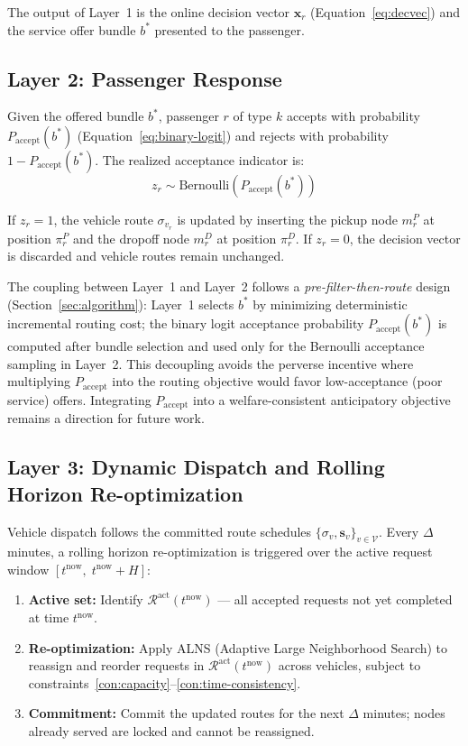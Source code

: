 The output of Layer~1 is the online decision vector $\mathbf{x}_r$ (Equation~\ref{eq:decvec})
and the service offer bundle $b^*$ presented to the passenger.

\subsection{Layer 2: Passenger Response}

Given the offered bundle $b^*$, passenger $r$ of type $k$ accepts with probability
$P_{\text{accept}}(b^*)$ (Equation~\ref{eq:binary-logit}) and rejects with probability
$1 - P_{\text{accept}}(b^*)$. The realized acceptance indicator is:
\begin{equation}
  z_r \sim \text{Bernoulli}\!\left(P_{\text{accept}}(b^*)\right)
\end{equation}

If $z_r = 1$, the vehicle route $\sigma_{v_r}$ is updated by inserting the pickup node
$m_r^P$ at position $\pi_r^P$ and the dropoff node $m_r^D$ at position $\pi_r^D$.
If $z_r = 0$, the decision vector is discarded and vehicle routes remain unchanged.

The coupling between Layer~1 and Layer~2 follows a \emph{pre-filter-then-route} design
(Section~\ref{sec:algorithm}): Layer~1 selects $b^*$ by minimizing deterministic
incremental routing cost; the binary logit acceptance probability
$P_{\text{accept}}(b^*)$ is computed after bundle selection and used only for
the Bernoulli acceptance sampling in Layer~2. This decoupling avoids the perverse
incentive where multiplying $P_{\text{accept}}$ into the routing objective would
favor low-acceptance (poor service) offers. Integrating $P_{\text{accept}}$ into a
welfare-consistent anticipatory objective remains a direction for future work.

\subsection{Layer 3: Dynamic Dispatch and Rolling Horizon Re-optimization}

Vehicle dispatch follows the committed route schedules
$\{\sigma_v, \mathbf{s}_v\}_{v \in \mathcal{V}}$.
Every $\Delta$ minutes, a rolling horizon re-optimization is triggered over the active
request window $[t^{\text{now}},\; t^{\text{now}} + H]$:

\begin{enumerate}
  \item \textbf{Active set:} Identify $\mathcal{R}^{\text{act}}(t^{\text{now}})$ --- all
        accepted requests not yet completed at time $t^{\text{now}}$.
  \item \textbf{Re-optimization:} Apply ALNS (Adaptive Large Neighborhood Search) to
        reassign and reorder requests in $\mathcal{R}^{\text{act}}(t^{\text{now}})$ across
        vehicles, subject to constraints~\ref{con:capacity}--\ref{con:time-consistency}.
  \item \textbf{Commitment:} Commit the updated routes for the next $\Delta$ minutes;
        nodes already served are locked and cannot be reassigned.
\end{enumerate}

